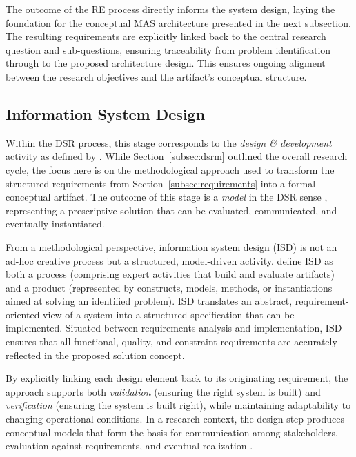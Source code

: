 The outcome of the RE process directly informs the system design, laying the foundation for the conceptual MAS architecture presented in the next subsection. The resulting requirements are explicitly linked back to the central research question and sub-questions, ensuring traceability from problem identification through to the proposed architecture design. This ensures ongoing aligment between the research objectives and the artifact’s conceptual structure.

\subsection{Information System Design}
Within the DSR process, this stage corresponds to the \emph{design \& development} activity as defined by \textcite{peffersDesignScienceMethodology2007}. While Section~\ref{subsec:dsrm} outlined the overall research cycle, the focus here is on the methodological approach used to transform the structured requirements from Section~\ref{subsec:requirements} into a formal conceptual artifact. The outcome of this stage is a \emph{model} in the DSR sense \parencite{peffersDesignScienceMethodology2007}, representing a prescriptive solution that can be evaluated, communicated, and eventually instantiated.

From a methodological perspective, information system design (ISD) is not an ad-hoc creative process but a structured, model-driven activity. \textcite[cf.][p. 68]{hevnerDesignScienceInformation2004} define ISD as both a process (comprising expert activities that build and evaluate artifacts) and a product (represented by constructs, models, methods, or instantiations aimed at solving an identified problem). ISD translates an abstract, requirement-oriented view of a system into a structured specification that can be implemented. Situated between requirements analysis and implementation, ISD ensures that all functional, quality, and constraint requirements are accurately reflected in the proposed solution concept.

By explicitly linking each design element back to its originating requirement, the approach supports both \emph{validation} (ensuring the right system is built) and \emph{verification} (ensuring the system is built right), while maintaining adaptability to changing operational conditions. In a research context, the design step produces conceptual models that form the basis for communication among stakeholders, evaluation against requirements, and eventual realization \parencite{wand1995ontology}.

